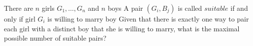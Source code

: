 There are $n$ girls $G_1,\ldots, G_n$ and $n$ boys   A pair $(G_i,B_j)$ is called $\textit{suitable}$ if and only if girl $G_i$ is willing to marry boy   Given that there is exactly one way to pair each girl with a distinct boy that she is willing to marry, what is the maximal possible number of suitable pairs?
